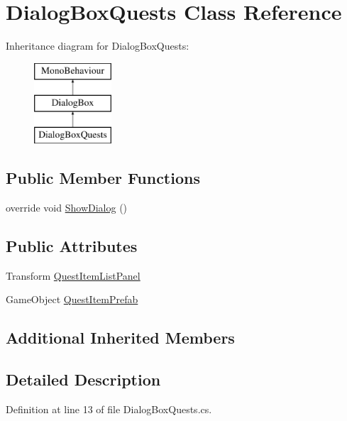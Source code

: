 \hypertarget{class_dialog_box_quests}{}\section{Dialog\+Box\+Quests Class Reference}
\label{class_dialog_box_quests}
Inheritance diagram for Dialog\+Box\+Quests\+:\begin{figure}[H]
\begin{center}
\leavevmode
\includegraphics[height=3.000000cm]{class_dialog_box_quests}
\end{center}
\end{figure}
\subsection*{Public Member Functions}
\begin{DoxyCompactItemize}
\item 
override void \hyperlink{class_dialog_box_quests_a968edfaf61e0958ded355ecec802c2b9}{Show\+Dialog} ()
\end{DoxyCompactItemize}
\subsection*{Public Attributes}
\begin{DoxyCompactItemize}
\item 
Transform \hyperlink{class_dialog_box_quests_afac37a2779c4bc3a146934a3f1eba81f}{Quest\+Item\+List\+Panel}
\item 
Game\+Object \hyperlink{class_dialog_box_quests_a2c6c15945b7377e7cc2ac9ad77fbba5f}{Quest\+Item\+Prefab}
\end{DoxyCompactItemize}
\subsection*{Additional Inherited Members}


\subsection{Detailed Description}


Definition at line 13 of file Dialog\+Box\+Quests.\+cs.



